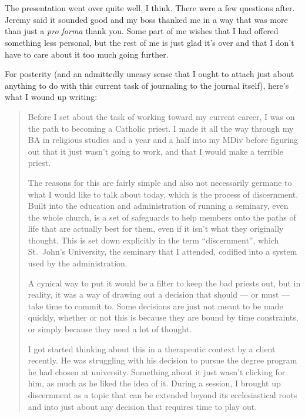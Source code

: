 \section{}

The presentation went over quite well, I think. There were a few questions after. Jeremy said it sounded good and my boss thanked me in a way that was more than just a \emph{pro forma} thank you. Some part of me wishes that I had offered something less personal, but the rest of me is just glad it's over and that I don't have to care about it too much going further.

For posterity (and an admittedly uneasy sense that I ought to attach just about anything to do with this current task of journaling to the journal itself), here's what I wound up writing:

\begin{quote}
\color{DarkSlateGray}
Before I set about the task of working toward my current career, I was on the path to becoming a Catholic priest. I made it all the way through my BA in religious studies and a year and a half into my MDiv before figuring out that it just wasn't going to work, and that I would make a terrible priest.

The reasons for this are fairly simple and also not necessarily germane to what I would like to talk about today, which is the process of discernment. Built into the education and administration of running a seminary, even the whole church, is a set of safeguards to help members onto the paths of life that are actually best for them, even if it isn't what they originally thought. This is set down explicitly in the term ``discernment'', which St.~John's University, the seminary that I attended, codified into a system used by the administration.

A cynical way to put it would be a filter to keep the bad priests out, but in reality, it was a way of drawing out a decision that should --- or must --- take time to commit to. Some decisions are just not meant to be made quickly, whether or not this is because they are bound by time constraints, or simply because they need a lot of thought.

I got started thinking about this in a therapeutic context by a client recently. He was struggling with his decision to pursue the degree program he had chosen at university. Something about it just wasn't clicking for him, as much as he liked the idea of it. During a session, I brought up discernment as a topic that can be extended beyond its ecclesiastical roots and into just about any decision that requires time to play out.


\end{quote}
